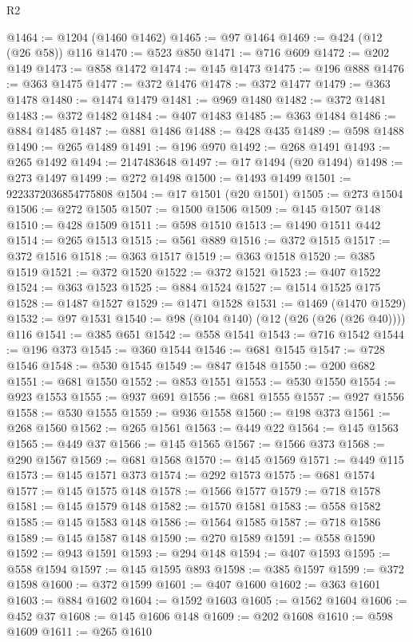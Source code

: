 \begin{lexlean}{R2}
\begin{coremodule}
@1464 := @1204 (@1460 @1462)
@1465 := @97 @1464
@1469 := @424 (@12 (@26 @58)) @116
@1470 := @523 @850
@1471 := @716 @609
@1472 := @202 @149
@1473 := @858 @1472
@1474 := @145 @1473
@1475 := @196 @888
@1476 := @363 @1475
@1477 := @372 @1476
@1478 := @372 @1477
@1479 := @363 @1478
@1480 := @1474 @1479
@1481 := @969 @1480
@1482 := @372 @1481
@1483 := @372 @1482
@1484 := @407 @1483
@1485 := @363 @1484
@1486 := @884 @1485
@1487 := @881 @1486
@1488 := @428 @435
@1489 := @598 @1488
@1490 := @265 @1489
@1491 := @196 @970
@1492 := @268 @1491
@1493 := @265 @1492
@1494 := 2147483648
@1497 := @17 @1494 (@20 @1494)
@1498 := @273 @1497
@1499 := @272 @1498
@1500 := @1493 @1499
@1501 := 9223372036854775808
@1504 := @17 @1501 (@20 @1501)
@1505 := @273 @1504
@1506 := @272 @1505
@1507 := @1500 @1506
@1509 := @145 @1507 @148
@1510 := @428 @1509
@1511 := @598 @1510
@1513 := @1490 @1511 @442
@1514 := @265 @1513
@1515 := @561 @889
@1516 := @372 @1515
@1517 := @372 @1516
@1518 := @363 @1517
@1519 := @363 @1518
@1520 := @385 @1519
@1521 := @372 @1520
@1522 := @372 @1521
@1523 := @407 @1522
@1524 := @363 @1523
@1525 := @884 @1524
@1527 := @1514 @1525 @175
@1528 := @1487 @1527
@1529 := @1471 @1528
@1531 := @1469 (@1470 @1529)
@1532 := @97 @1531
@1540 := @98 (@104 @140) (@12 (@26 (@26 (@26 @40)))) @116
@1541 := @385 @651
@1542 := @558 @1541
@1543 := @716 @1542
@1544 := @196 @373
@1545 := @360 @1544
@1546 := @681 @1545
@1547 := @728 @1546
@1548 := @530 @1545
@1549 := @847 @1548
@1550 := @200 @682
@1551 := @681 @1550
@1552 := @853 @1551
@1553 := @530 @1550
@1554 := @923 @1553
@1555 := @937 @691
@1556 := @681 @1555
@1557 := @927 @1556
@1558 := @530 @1555
@1559 := @936 @1558
@1560 := @198 @373
@1561 := @268 @1560
@1562 := @265 @1561
@1563 := @449 @22
@1564 := @145 @1563
@1565 := @449 @37
@1566 := @145 @1565
@1567 := @1566 @373
@1568 := @290 @1567
@1569 := @681 @1568
@1570 := @145 @1569
@1571 := @449 @115
@1573 := @145 @1571 @373
@1574 := @292 @1573
@1575 := @681 @1574
@1577 := @145 @1575 @148
@1578 := @1566 @1577
@1579 := @718 @1578
@1581 := @145 @1579 @148
@1582 := @1570 @1581
@1583 := @558 @1582
@1585 := @145 @1583 @148
@1586 := @1564 @1585
@1587 := @718 @1586
@1589 := @145 @1587 @148
@1590 := @270 @1589
@1591 := @558 @1590
@1592 := @943 @1591
@1593 := @294 @148
@1594 := @407 @1593
@1595 := @558 @1594
@1597 := @145 @1595 @893
@1598 := @385 @1597
@1599 := @372 @1598
@1600 := @372 @1599
@1601 := @407 @1600
@1602 := @363 @1601
@1603 := @884 @1602
@1604 := @1592 @1603
@1605 := @1562 @1604
@1606 := @452 @37
@1608 := @145 @1606 @148
@1609 := @202 @1608
@1610 := @598 @1609
@1611 := @265 @1610

\end{coremodule}
\end{lexlean}
